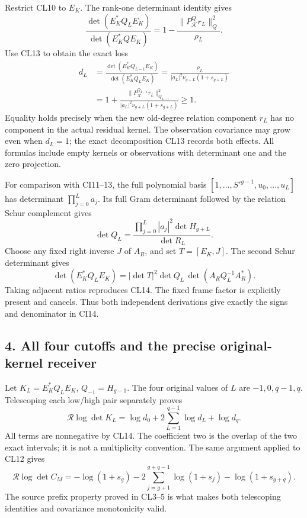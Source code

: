 \documentclass[11pt]{article}
\begin{document}
Restrict CL10 to \(E_K\). The rank-one determinant identity gives \[
\frac{\det(E_K^*Q_LE_K)}{\det(E_K^*QE_K)}
=1-\frac{\|P_{\mathcal K}^{Q}r_L\|_Q^2}{\rho_L}.
\] Use CL13 to obtain the exact loss \[
\boxed{
\begin{aligned}
d_L&=\frac{\det(E_K^*Q_{L-1}E_K)}{\det(E_K^*Q_LE_K)}
=\frac{\rho_L}{|a_L|^2\nu_{g+L}(1+s_{g+L})}
\\&=1+\frac{\|P_{\mathcal K}^{Q_{L-1}}r_L\|_{Q_{L-1}}^2}
{|a_L|^2\nu_{g+L}(1+s_{g+L})}\ge1.
\end{aligned}}
\tag{CL14}
\] Equality holds precisely when the new old-degree relation component \(r_L\) has no component in the actual residual kernel. The observation covariance may grow even when \(d_L=1\); the exact decomposition CL13 records both effects. All formulas include empty kernels or observations with determinant one and the zero projection.

For comparison with CI11--13, the full polynomial basis \([1,\ldots,S'^{g-1},u_0,\ldots,u_L]\) has determinant \(\prod_{j=0}^La_j\). Its full Gram determinant followed by the relation Schur complement gives \[
\det Q_L=\frac{\prod_{j=0}^L|a_j|^2\det H_{g+L}}{\det R_L}.
\] Choose any fixed right inverse \(J\) of \(A_R\), and set \(T=[E_K,J]\). The second Schur determinant gives \[
\det(E_K^*Q_LE_K)=|\det T|^2\det Q_L\,\det(A_RQ_L^{-1}A_R^*).
\tag{CL15}
\] Taking adjacent ratios reproduces CL14. The fixed frame factor is explicitly present and cancels. Thus both independent derivations give exactly the signs and denominator in CI14.

\subsection{4. All four cutoffs and the precise original-kernel receiver}\label{all-four-cutoffs-and-the-precise-original-kernel-receiver}

Let \(K_L=E_K^*Q_LE_K\), \(Q_{-1}=H_{g-1}\). The four original values of \(L\) are \(-1,0,q-1,q\). Telescoping each low/high pair separately proves \[
\boxed{
\mathcal R\log\det K_L
=\log d_0+2\sum_{L=1}^{q-1}\log d_L+\log d_q.}
\tag{CL16}
\] All terms are nonnegative by CL14. The coefficient two is the overlap of the two exact intervals; it is not a multiplicity convention. The same argument applied to CL12 gives \[
\mathcal R\log\det C_M
=-\log(1+s_g)-2\sum_{j=g+1}^{g+q-1}\log(1+s_j)
-\log(1+s_{g+q}).
\tag{CL17}
\] The source prefix property proved in CL3--5 is what makes both telescoping identities and covariance monotonicity valid.
\end{document}
